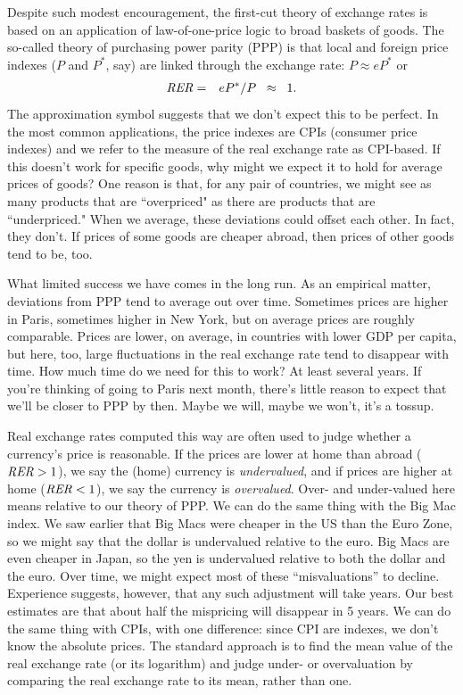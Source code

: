 \documentclass[letterpaper,12pt]{article}
\begin{document}
Despite such modest encouragement,
the first-cut theory of exchange rates is based on an application of
law-of-one-price logic to broad baskets of goods.
The so-called theory of purchasing power parity (PPP)
is that local and foreign price indexes ($P$ and $P^*$, say)
are linked through the exchange rate:  $ P \approx e P^* $ or
\begin{eqnarray}
    \mbox{\it RER\/} &=& eP^* /P \;\;\approx\;\; 1.
    \label{eq:ppp} 
\end{eqnarray}
The approximation symbol suggests that we don't expect this to be perfect.
In the most common applications, the price indexes are CPIs
(consumer price indexes)
and we refer to the measure of the real exchange rate as CPI-based.
If this doesn't work for specific goods, why might we expect it to hold
for average prices of goods?
One reason is that, for any pair of countries,
we might see as many products that are ``overpriced"
as there are products that are ``underpriced."
When we average, these deviations could offset each other.
In fact, they don't.
If prices of some goods are cheaper abroad, then prices
of other goods tend to be, too.

What limited success we have comes in the long run.
As an empirical matter,
deviations from PPP tend to average out over time.
Sometimes prices are higher in Paris, sometimes higher in New York,
but on average prices are roughly comparable.
Prices are lower, on average, in countries with lower GDP per capita,
but here, too, large fluctuations in the real exchange rate tend to disappear
with time.
How much time do we need for this to work?
At least several years.
If you're thinking of going to Paris next month, 
there's little reason to expect that we'll be closer to PPP by then.  
Maybe we will, maybe we won't, it's a tossup.  


Real exchange rates computed this way are often used to judge whether
a currency's price is reasonable.
If the prices are lower at home than abroad ($\mbox{\it RER\/} > 1$),
we say the (home) currency is {\it undervalued\/},
and if prices are higher at home ($\mbox{\it RER\/} < 1$),
we say the currency is {\it overvalued\/}.
Over- and under-valued here means relative to our theory of PPP.  
We can do the same thing with the Big Mac index.
We saw earlier that Big Macs were cheaper in the US than the Euro Zone,
so we might say that the dollar is undervalued relative to the euro.
Big Macs are even cheaper in Japan, so the yen is undervalued relative
to both the dollar and the euro.
Over time, we might expect most of these ``misvaluations'' to decline.
Experience suggests, however, that any such adjustment will take years.
Our best estimates are that about half the mispricing will disappear
in 5 years.
We can do the same thing with CPIs, with one difference:
since CPI are indexes, we don't know the absolute prices.
The standard approach is to find the mean value of the real exchange rate
(or its logarithm) and judge under- or overvaluation by comparing the
real exchange rate to its mean, rather than one.
\end{document}
